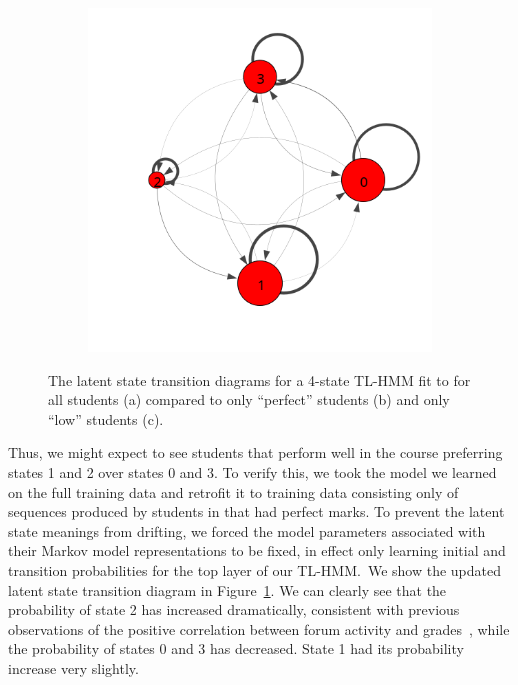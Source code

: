 \begin{figure}
\begin{subfigure}[t]{0.25\textwidth}
    \caption{\label{fig:trans-perfect}}
  \end{subfigure}%
  \begin{subfigure}[t]{0.25\textwidth}
    \includegraphics[width=\textwidth,trim={0, 3cm 0 2cm}]{../figures/trans-comp/trans-low.png}
    \caption{\label{fig:trans-low}}
  \end{subfigure}
  \caption{The latent state transition diagrams for a 4-state TL-HMM fit to
  \protect\textretrieval{} for all students (a) compared to only ``perfect''
  students (b) and only ``low'' students (c).}
  \label{fig:trans-comp}
\end{figure}

Thus, we might expect to see students that perform well in the course
preferring states 1 and 2 over states 0 and 3. To verify this, we took the
model we learned on the full training data and retrofit it to training data
consisting only of sequences produced by students in \textretrieval{} that
had perfect marks. To prevent the latent state meanings from drifting, we
forced the model parameters associated with their Markov model
representations to be fixed, in effect only learning initial and transition
probabilities for the top layer of our TL-HMM.\ We show the updated latent
state transition diagram in Figure~\ref{fig:trans-perfect}. We can clearly
see that the probability of state 2 has increased dramatically, consistent
with previous observations of the positive correlation between forum
activity and grades~\cite{Huang:2014:LAS}, while the probability of states
0 and 3 has decreased. State 1 had its probability increase very slightly.

